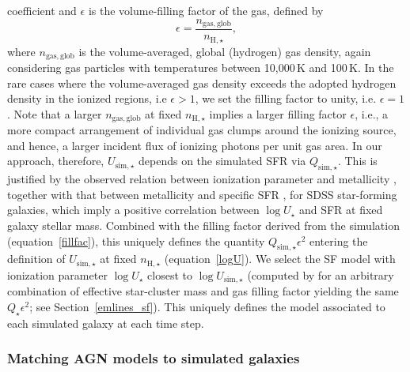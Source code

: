 \documentclass[fleqn,usenatbib]{mnras}
\begin{document}
coefficient and $\epsilon$ is the volume-filling factor of the gas,
defined by 
\begin{equation}\label{fillfac}
\epsilon = \frac{n_{\mathrm{gas, glob}}}{n_{\mathrm{H},\star}},
\end{equation}
where  $n_{\mathrm{gas, glob}}$  is the volume-averaged,
  global  (hydrogen) gas density, again considering gas particles
  with temperatures between 10,000\,K and 100\,K.  In the rare cases where
the volume-averaged gas density exceeds the adopted hydrogen density in
the ionized regions, i.e  $\epsilon > 1$, we set the filling factor to unity, 
i.e. $\epsilon = 1$. Note that a larger  $n_{\mathrm{gas, glob}}$ at fixed
$n_{\mathrm{H},\star}$ implies a larger filling factor $\epsilon$,
i.e., a more  compact arrangement of individual gas clumps around the
ionizing source, and hence, a larger incident flux of ionizing photons
per unit gas area. In our approach, therefore, $U_{\mathrm{sim}, \star}$ 
depends on the simulated SFR via $Q_{\mathrm{sim},\star}$. This is justified  
by the observed relation between ionization parameter and metallicity 
\citep[fig. 2 of][]{Carton17}, together with that between metallicity and specific 
SFR \citep[fig. 7 of][]{Mannucci10}, for SDSS star-forming galaxies, 
which imply a positive correlation between $\log U_{\star}$ and SFR at fixed 
galaxy stellar mass. Combined with the filling factor derived from the simulation 
(equation~\ref{fillfac}), this uniquely defines the quantity $Q_{\mathrm{sim},\star}\epsilon^2$ 
entering the definition of $U_{\mathrm{sim}, \star}$ at fixed $n_{\mathrm{H},\star}$ 
(equation~\ref{logU}). We select the SF model with ionization parameter
$\log U_{\star}$ closest to $\log U_{\mathrm{sim}, \star}$ (computed by
\citealt{Gutkin16} for an arbitrary combination of effective star-cluster mass and gas 
filling factor yielding the same $Q_{\star}\epsilon^2$; see Section~\ref{emlines_sf}). 
This uniquely defines the \citet{Gutkin16} model associated to each
simulated galaxy at each time step. 
\bigskip

\subsubsection{Matching AGN models to simulated galaxies}\label{agnmatch}
\end{document}
